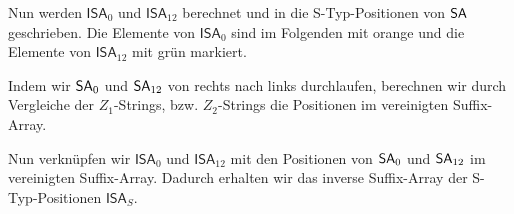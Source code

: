 Nun werden $\mathsf{ISA}_0$ und $\mathsf{ISA}_{12}$ berechnet und in die S-Typ-Positionen von $\sa$ geschrieben. Die Elemente von $\mathsf{ISA}_0$ sind im Folgenden mit orange und die Elemente von $\mathsf{ISA}_{12}$ mit grün markiert.

\begin{table}[H]
	\footnotesize
	\centering
\end{table}

Indem wir $\sa_0$ und $\sa_{12}$ von rechts nach links durchlaufen, berechnen wir durch Vergleiche der $Z_1$-Strings, bzw. $Z_2$-Strings die Positionen im vereinigten Suffix-Array. 

\begin{table}[H]
	\footnotesize
	\centering
\end{table}

Nun verknüpfen wir $\mathsf{ISA}_0$ und $\mathsf{ISA}_{12}$ mit den Positionen von $\sa_0$ und $\sa_{12}$ im vereinigten Suffix-Array. Dadurch erhalten wir das inverse Suffix-Array der S-Typ-Positionen $\mathsf{ISA}_S$.

